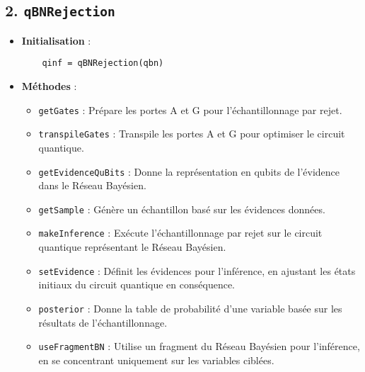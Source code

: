 \subsection*{2. \texttt{qBNRejection}}
\begin{itemize}
    \item \textbf{Initialisation} : 
    \begin{minipage}{\linewidth}
    \begin{lstlisting}
    qinf = qBNRejection(qbn)
    \end{lstlisting}
    \end{minipage}
    

    \item \textbf{Méthodes} :
    \begin{itemize}
        \item \texttt{getGates} : Prépare les portes A et G pour l'échantillonnage par rejet.
        \item \texttt{transpileGates} : Transpile les portes A et G pour optimiser le circuit quantique.
        \item \texttt{getEvidenceQuBits} : Donne la représentation en qubits de l'évidence dans le Réseau Bayésien.
        \item \texttt{getSample} : Génère un échantillon basé sur les évidences données.
        \item \texttt{makeInference} : Exécute l'échantillonnage par rejet sur le circuit quantique représentant le Réseau Bayésien.
        \item \texttt{setEvidence} : Définit les évidences pour l'inférence, en ajustant les états initiaux du circuit quantique en conséquence.
        \item \texttt{posterior} : Donne la table de probabilité d'une variable basée sur les résultats de l'échantillonnage.
        \item \texttt{useFragmentBN} : Utilise un fragment du Réseau Bayésien pour l'inférence, en se concentrant uniquement sur les variables ciblées. 

    \end{itemize}
\end{itemize}

